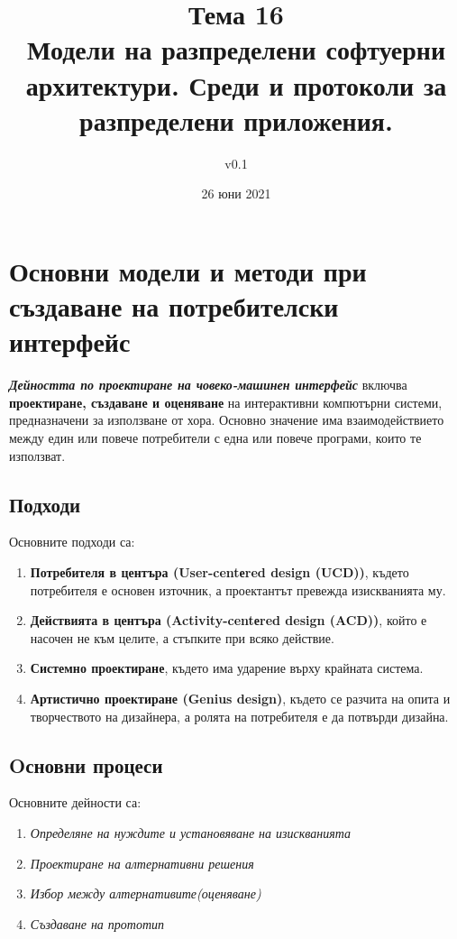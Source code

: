 \documentclass[fleqn,12pt]{article}
\title{Тема 16\\ Модели на разпределени софтуерни архитектури. Среди и протоколи за разпределени приложения.}
\author{v0.1}
\date{26 юни 2021}
\begin{document}
\maketitle
\tableofcontents
\pagebreak

\section{Основни  модели  и  методи  при  създаване  на  потребителски  интерфейс}

\textbf{\textit{Дейността по проектиране на човеко-машинен интерфейс}} включва \textbf{проектиране, създаване и оценяване} на интерактивни компютърни системи, предназначени за използване от хора.
\bigbreak
Основно значение има взаимодействието между един или повече потребители с една или повече програми, които те използват. 

\subsection{Подходи}

Основните подходи са:
\begin{enumerate}
    \item \textbf{Потребителя в центъра (User-centеred design (UCD))}, където потребителя е основен източник, а проектантът превежда изискванията му.
    \item \textbf{Действията в центъра (Activity-centеred design (ACD))}, който е насочен не към целите, а стъпките при всяко действие.
    \item \textbf{Системно проектиране}, където има ударение върху крайната система.
    \item \textbf{Артистично проектиране (Genius design)}, където се разчита на опита и творчеството на дизайнера, а ролята на потребителя е да потвърди дизайна.
\end{enumerate}

\subsection{Oсновни процеси}

Основните дейности са:
\begin{enumerate}
    \item \textit{Определяне на нуждите и установяване на изискванията}
    \item \textit{Проектиране на алтернативни решения}
    \item \textit{Избор между алтернативите(оценяване)}
    \item \textit{Създаване на прототип}
\end{enumerate}
\end{document}
